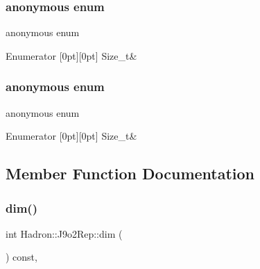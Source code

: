 \subsubsection{\texorpdfstring{anonymous enum}{anonymous enum}}
{\footnotesize\ttfamily anonymous enum}

\begin{DoxyEnumFields}{Enumerator}
[0pt][0pt]{}\mbox{\label{structHadron_1_1J9o2Rep_a1b58d6d41ec9bf8e0d82c0c8b7f50121a09b9294087bdd9522fa9c8db5825d0db}} 
Size\+\_\+t&\\
\hline

\end{DoxyEnumFields}
\mbox{\label{structHadron_1_1J9o2Rep_a1b58d6d41ec9bf8e0d82c0c8b7f50121}} 
\subsubsection{\texorpdfstring{anonymous enum}{anonymous enum}}
{\footnotesize\ttfamily anonymous enum}

\begin{DoxyEnumFields}{Enumerator}
[0pt][0pt]{}\mbox{\label{structHadron_1_1J9o2Rep_a1b58d6d41ec9bf8e0d82c0c8b7f50121a09b9294087bdd9522fa9c8db5825d0db}} 
Size\+\_\+t&\\
\hline

\end{DoxyEnumFields}


\subsection{Member Function Documentation}
\mbox{\label{structHadron_1_1J9o2Rep_a66921d681b6217d1ef68bc63ad21cd15}} 
\subsubsection{\texorpdfstring{dim()}{dim()}\hspace{0.1cm}{\footnotesize\ttfamily [1/3]}}
{\footnotesize\ttfamily int Hadron\+::\+J9o2\+Rep\+::dim (\begin{DoxyParamCaption}{ }\end{DoxyParamCaption}) const\hspace{0.3cm}{\ttfamily [inline]}, {\ttfamily [virtual]}}



